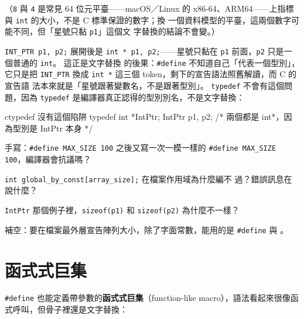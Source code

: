 
（\texttt{8} 與 \texttt{4} 是常見 64 位元平臺——macOS／Linux 的
x86-64、ARM64——上指標與 \texttt{int} 的大小，不是 C 標準保證的數字；換
一個資料模型的平臺，這兩個數字可能不同，但「星號只黏 \texttt{p1}」這個文
字替換的結論不會變。）

\texttt{INT\_PTR p1, p2;} 展開後是 \texttt{int * p1, p2;}——星號只黏在
\texttt{p1} 前面，\texttt{p2} 只是一個普通的 \texttt{int}。 這正是文字替換
的後果：\texttt{\#define} 不知道自己「代表一個型別」，它只是把 \texttt{INT\_PTR}
換成 \texttt{int *} 這三個 token，剩下的宣告語法照舊解讀，而 C 的宣告語
法本來就是「星號跟著變數名，不是跟著型別」。 \texttt{typedef} 不會有這個問
題，因為 \texttt{typedef} 是編譯器真正認得的型別別名，不是文字替換：

\begin{code}{c}{typedef 沒有這個陷阱}
typedef int *IntPtr;
IntPtr p1, p2;  /* 兩個都是 int*，因為型別是 IntPtr 本身 */
\end{code}


\begin{drills}[label=drills:pp-define]
\item 手寫：\texttt{\#define MAX\_SIZE 100} 之後又寫一次一模一樣的
\texttt{\#define MAX\_SIZE 100}，編譯器會抗議嗎？
\item \texttt{int global\_by\_const[array\_size];} 在檔案作用域為什麼編不
過？錯誤訊息在說什麼？
\item \texttt{IntPtr} 那個例子裡，\texttt{sizeof(p1)} 和 \texttt{sizeof(p2)}
為什麼不一樣？
\item 補空：要在檔案最外層宣告陣列大小，除了字面常數，能用的是
\texttt{\#define} 與 \underline{\hspace{2em}}。
\end{drills}

\section{函式式巨集}
\label{sec:pp-funcmacro}

\texttt{\#define} 也能定義帶參數的\textbf{函式式巨集}（function-like
macro），語法看起來很像函式呼叫，但骨子裡還是文字替換：

